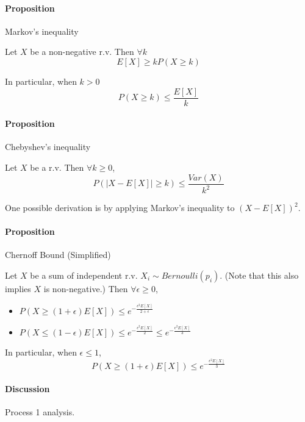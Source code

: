 \documentclass[a4paper]{article}
\newcommand{\abs}[1]{\left | #1 \right |}
\begin{document}
\paragraph{Proposition} Markov's inequality

Let $X$ be a non-negative r.v. Then $\forall k$
\begin{equation}
	E[X]\geq kP(X\geq k)
\end{equation}

In particular, when $k > 0$
\begin{equation}
	P(X\geq k)\leq \frac{E[X]}{k}
\end{equation}

\paragraph{Proposition} Chebyshev's inequality

Let $X$ be a r.v. Then $\forall k\geq 0$,
\begin{equation}
	P(\abs{X-E[X]} \geq k) \leq \frac{Var(X)}{k^2}
\end{equation}

One possible derivation is by applying Markov's inequality to $(X-E[X])^2$.


\paragraph{Proposition} Chernoff Bound (Simplified)

Let $X$ be a sum of independent r.v. $X_i\sim Bernoulli(p_i)$. (Note that this also implies $X$ is non-negative.) Then $\forall \epsilon \geq 0$,
\begin{itemize}
	\item $P(X\geq (1+\epsilon)E[X]) \leq e^{-\frac{\epsilon^2E[X]}{2 + \epsilon}}$
	\item $P(X\leq (1-\epsilon)E[X]) \leq e^{-\frac{\epsilon^2E[X]}{2}} \leq e^{-\frac{\epsilon^2E[X]}{3}}$
\end{itemize}

In particular, when $\epsilon \leq 1$,
\begin{equation}
	P(X\geq (1+\epsilon)E[X]) \leq e^{-\frac{\epsilon^2E[X]}{3}}
\end{equation}



\paragraph{Discussion} Process 1 analysis.
\end{document}
